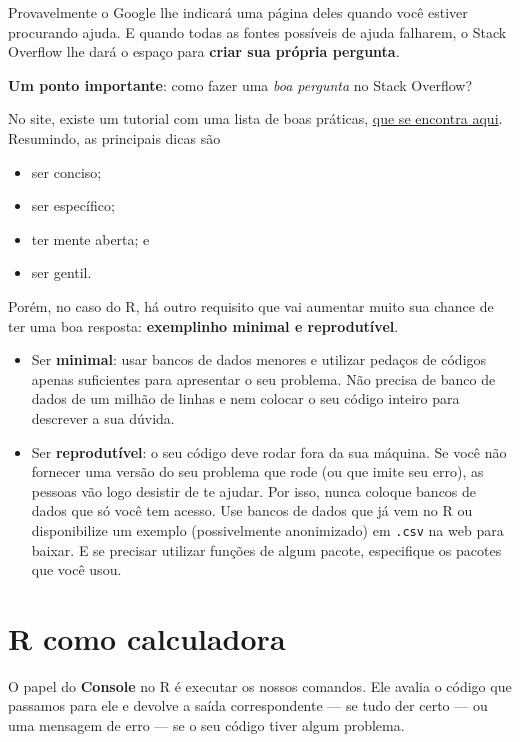 \documentclass[]{book}
\providecommand{\tightlist}{%
  \setlength{\itemsep}{0pt}\setlength{\parskip}{0pt}}
\begin{document}
Provavelmente o Google lhe indicará uma página deles quando você estiver procurando ajuda. E quando todas as fontes possíveis de ajuda falharem, o Stack Overflow lhe dará o espaço para \textbf{criar sua própria pergunta}.

\textbf{Um ponto importante}: como fazer uma \emph{boa pergunta} no Stack Overflow?

No site, existe um tutorial com uma lista de boas práticas, \href{http://pt.stackoverflow.com/help/how-to-ask}{que se encontra aqui}. Resumindo, as principais dicas são

\begin{itemize}
\tightlist
\item
  ser conciso;
\item
  ser específico;
\item
  ter mente aberta; e
\item
  ser gentil.
\end{itemize}

Porém, no caso do R, há outro requisito que vai aumentar muito sua chance de ter uma boa resposta: \textbf{exemplinho minimal e reprodutível}.

\begin{itemize}
\item
  Ser \textbf{minimal}: usar bancos de dados menores e utilizar pedaços de códigos apenas suficientes para apresentar o seu problema. Não precisa de banco de dados de um milhão de linhas e nem colocar o seu código inteiro para descrever a sua dúvida.
\item
  Ser \textbf{reprodutível}: o seu código deve rodar fora da sua máquina. Se você não fornecer uma versão do seu problema que rode (ou que imite seu erro), as pessoas vão logo desistir de te ajudar. Por isso, nunca coloque bancos de dados que só você tem acesso. Use bancos de dados que já vem no R ou disponibilize um exemplo (possivelmente anonimizado) em \texttt{.csv} na web para baixar. E se precisar utilizar funções de algum pacote, especifique os pacotes que você usou.
\end{itemize}

\hypertarget{r-como-calculadora}{%
\section{R como calculadora}\label{r-como-calculadora}}

O papel do \textbf{Console} no R é executar os nossos comandos. Ele avalia o código que passamos para ele e devolve a saída correspondente --- se tudo der certo --- ou uma mensagem de erro --- se o seu código tiver algum problema.
\end{document}
